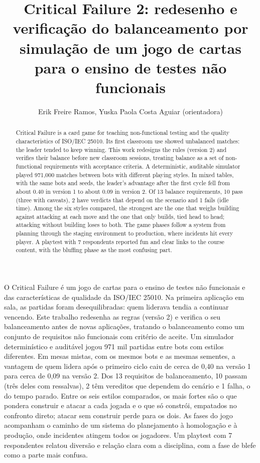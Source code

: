 \documentclass[12pt]{article}
\title{Critical Failure 2: redesenho e verificação do balanceamento por simulação de um jogo de cartas para
o ensino de testes não funcionais}
\author{Erik Freire Ramos\inst{1}, Yuska Paola Costa Aguiar\inst{1} (orientadora)}
\newif\ifrevisaocolorida
\DeclareRobustCommand{\revisao}[1]{\ifrevisaocolorida\textcolor{blue}{#1}\else#1\fi}
\begin{document}


\maketitle

\begin{abstract}
  Critical Failure is a card game for teaching non-functional testing and the quality characteristics of
  ISO/IEC 25010. Its first classroom use showed unbalanced matches: the leader tended to keep winning.
  This work redesigns the rules (version 2) and verifies their balance before new classroom sessions, treating
  balance as a set of non-functional requirements with acceptance criteria. A deterministic, auditable
  simulator played 971,000 matches between bots with different playing styles. \revisao{In mixed tables, with the
  same bots and seeds, the} leader's advantage after the first cycle fell from about 0.40 in version 1 to about
  0.09 in version 2. \revisao{Of 13 balance requirements, 10 pass (three with caveats), 2 have verdicts that
  depend on the scenario and 1 fails (idle time). Among the six styles compared, the strongest are the one that
  weighs building against attacking at each move and the one that only builds, tied head to head; attacking
  without building loses to both.} The game phases follow a system from planning through the
  staging environment to production, where incidents hit every player. A playtest with 7 respondents reported fun
  and clear links to the course content, with the bluffing phase as the most confusing part.
\end{abstract}

\begin{resumo}
  O Critical Failure é um jogo de cartas para o ensino de testes não funcionais e das características de
  qualidade da ISO/IEC 25010. Na primeira aplicação em sala, as partidas foram desequilibradas: quem liderava
  tendia a continuar vencendo. Este trabalho redesenha as regras (versão 2) e verifica o seu balanceamento antes
  de novas aplicações, tratando o balanceamento como um conjunto de requisitos não funcionais com critério de
  aceite. Um simulador determinístico e auditável jogou 971 mil partidas entre bots com estilos diferentes.
  \revisao{Em mesas mistas, com os mesmos bots e as mesmas sementes, a} vantagem de quem lidera após o primeiro
  ciclo caiu de cerca de 0,40 na versão 1 para cerca de 0,09 na versão 2. \revisao{Dos 13 requisitos de
  balanceamento, 10 passam (três deles com ressalvas), 2 têm vereditos que dependem do cenário e 1 falha, o do
  tempo parado. Entre os seis estilos comparados, os mais fortes são o que pondera construir e atacar a cada
  jogada e o que só constrói, empatados no confronto direto; atacar sem construir perde para os dois.} As fases
  do jogo acompanham o caminho de um sistema do planejamento à homologação e à produção, onde incidentes atingem
  todos os jogadores. Um playtest com 7 respondentes relatou diversão e relação clara com a disciplina, com a
  fase de blefe como a parte mais confusa.
\end{resumo}
\end{document}
